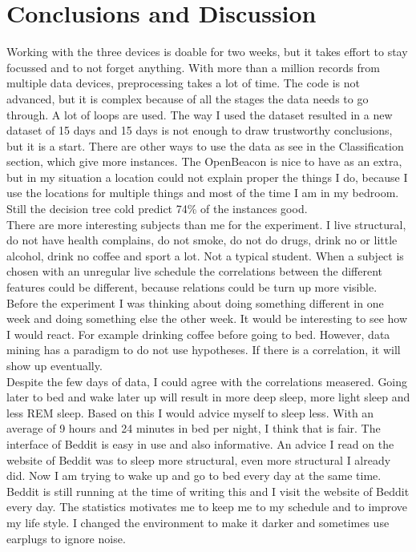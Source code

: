 \section{Conclusions and Discussion}
	Working with the three devices is doable for two weeks, but it takes effort to stay focussed and to not forget anything. With more than a million records from multiple data devices, preprocessing takes a lot of time. The code is not advanced, but it is complex because of all the stages the data needs to go through. A lot of loops are used. The way I used the dataset resulted in a new dataset of 15 days and 15 days is not enough to draw trustworthy conclusions, but it is a start. There are other ways to use the data as see in the Classification section, which give more instances. The OpenBeacon is nice to have as an extra, but in my situation a location could not explain proper the things I do, because I use the locations for multiple things and most of the time I am in my bedroom. Still the decision tree cold predict 74\% of the instances good. 
	\\
	There are more interesting subjects than me for the experiment. I live structural, do not have health complains, do not smoke, do not do drugs, drink no or little alcohol, drink no coffee and sport a lot. Not a typical student. When a subject is chosen with an unregular live schedule the correlations between the different features could be different, because relations could be turn up more visible. Before the experiment I was thinking about doing something different in one week and doing something else the other week. It would be interesting to see how I would react. For example drinking coffee before going to bed. However, data mining has a paradigm to do not use hypotheses. If there is a correlation, it will show up eventually.
	\\
	Despite the few days of data, I could agree with the correlations measered. Going later to bed and wake later up will result in more deep sleep, more light sleep and less REM sleep. Based on this I would advice myself to sleep less. With an average of 9 hours and 24 minutes in bed per night, I think that is fair. The interface of Beddit is easy in use and also informative. An advice I read on the website of Beddit was to sleep more structural, even more structural I already did. Now I am trying to wake up and go to bed every day at the same time. Beddit is still running at the time of writing this and I visit the website of Beddit every day. The statistics motivates me to keep me to my schedule and to improve my life style. I changed the environment to make it darker and sometimes use earplugs to ignore noise. 

